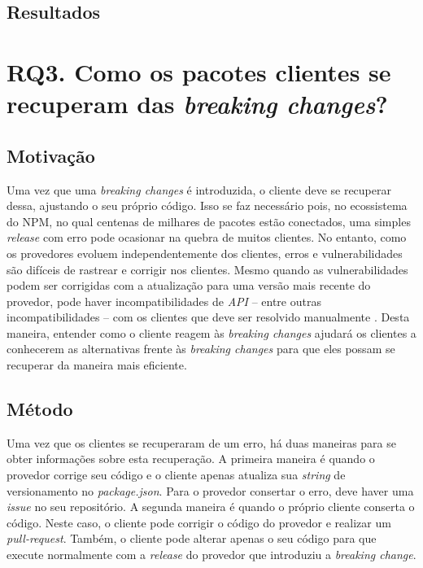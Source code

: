 \subsection{Resultados}
\label{fin:rq2}

\section{RQ3. Como os pacotes clientes se recuperam das \textit{breaking changes}?}
\label{sec:rq3}

\subsection{Motivação}
\label{mot:rq3}
Uma vez que uma \textit{breaking changes} é introduzida, o cliente deve se recuperar dessa, ajustando o seu próprio código. Isso se faz necessário pois, no ecossistema do  \gls{NPM}, no qual centenas de milhares de pacotes estão conectados, uma simples \textit{release} com erro pode ocasionar na quebra de muitos clientes. No entanto, como os provedores evoluem independentemente dos clientes, erros e vulnerabilidades são difíceis de rastrear e corrigir nos clientes. Mesmo quando as vulnerabilidades podem ser corrigidas com a atualização para uma versão mais recente do provedor, pode haver incompatibilidades de \textit{API} -- entre outras incompatibilidades -- com os clientes que deve ser resolvido manualmente \cite{Foo:2018:ESC:3236024.3275535}. Desta maneira, entender como o cliente reagem às \textit{breaking changes} ajudará os clientes a conhecerem as alternativas frente às \textit{breaking changes} para que eles possam se recuperar da maneira mais eficiente.

\subsection{Método}
\label{apr:rq3}
Uma vez que os clientes se recuperaram de um erro, há duas maneiras para se obter informações sobre esta recuperação. A primeira maneira é quando o provedor corrige seu código e o cliente apenas atualiza sua \textit{string} de versionamento no \textit{package.json}. Para o provedor consertar o erro, deve haver uma \textit{issue} no seu repositório. A segunda maneira é quando o próprio cliente conserta o código. Neste caso, o cliente pode corrigir o código do provedor e realizar um \textit{pull-request}. Também, o cliente pode alterar apenas o seu código para que execute normalmente com a \textit{release} do provedor que introduziu a \textit{breaking change}.

